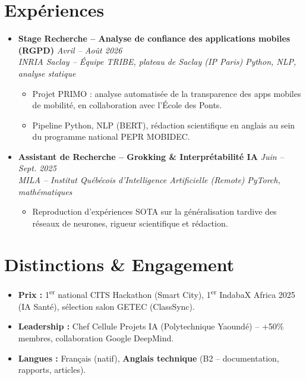 \documentclass[a4paper,11pt]{article}
\begin{document}
\section{Expériences}
\begin{itemize}[leftmargin=*, label={-}]

\item \textbf{Stage Recherche -- Analyse de confiance des applications mobiles (RGPD)} \hfill \textit{Avril -- Août 2026} \\
\textit{INRIA Saclay -- Équipe TRIBE, plateau de Saclay (IP Paris)} \hfill \textit{Python, NLP, analyse statique}
\vspace{-2pt}
    \begin{itemize}[leftmargin=0.4cm, nosep, label=\tiny$\bullet$]
        \item \small{Projet PRIMO : analyse automatisée de la transparence des apps mobiles de mobilité, en collaboration avec l'École des Ponts.}
        \item \small{Pipeline Python, NLP (BERT), rédaction scientifique en anglais au sein du programme national PEPR MOBIDEC.}
    \end{itemize}
\vspace{3pt}

\item \textbf{Assistant de Recherche -- Grokking \& Interprétabilité IA} \hfill \textit{Juin -- Sept. 2025} \\
\textit{MILA -- Institut Québécois d'Intelligence Artificielle (Remote)} \hfill \textit{PyTorch, mathématiques}
\vspace{-2pt}
    \begin{itemize}[leftmargin=0.4cm, nosep, label=\tiny$\bullet$]
        \item \small{Reproduction d'expériences SOTA sur la généralisation tardive des réseaux de neurones, rigueur scientifique et rédaction.}
    \end{itemize}

\end{itemize}

\section{Distinctions \& Engagement}
\begin{itemize}[leftmargin=*, nosep]
    \item \small{\textbf{Prix :} 1\textsuperscript{er} national CITS Hackathon (Smart City), 1\textsuperscript{er} IndabaX Africa 2025 (IA Santé), sélection salon GETEC (ClassSync).}
    \item \small{\textbf{Leadership :} Chef Cellule Projets IA (Polytechnique Yaoundé) -- +50\% membres, collaboration Google DeepMind.}
    \item \small{\textbf{Langues :} Français (natif), \textbf{Anglais technique} (B2 -- documentation, rapports, articles).}
\end{itemize}
\end{document}
